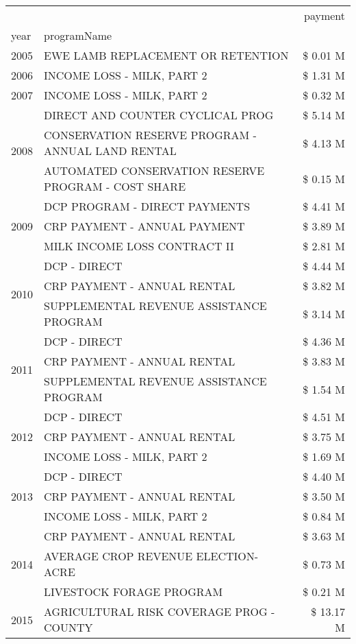 \begin{tabular}{llr}
\toprule
 &  & payment \\
year & programName &  \\
\midrule
2005 & EWE LAMB REPLACEMENT OR RETENTION & \$ 0.01 M \\
\cline{1-3}
2006 & INCOME LOSS - MILK, PART 2 & \$ 1.31 M \\
\cline{1-3}
2007 & INCOME LOSS - MILK, PART 2 & \$ 0.32 M \\
\cline{1-3}
\multirow[t]{3}{*}{2008} & DIRECT AND COUNTER CYCLICAL PROG & \$ 5.14 M \\
 & CONSERVATION RESERVE PROGRAM - ANNUAL LAND RENTAL & \$ 4.13 M \\
 & AUTOMATED CONSERVATION RESERVE PROGRAM - COST SHARE & \$ 0.15 M \\
\cline{1-3}
\multirow[t]{3}{*}{2009} & DCP PROGRAM - DIRECT PAYMENTS & \$ 4.41 M \\
 & CRP PAYMENT - ANNUAL PAYMENT & \$ 3.89 M \\
 & MILK INCOME LOSS CONTRACT II & \$ 2.81 M \\
\cline{1-3}
\multirow[t]{3}{*}{2010} & DCP - DIRECT & \$ 4.44 M \\
 & CRP PAYMENT - ANNUAL RENTAL & \$ 3.82 M \\
 & SUPPLEMENTAL REVENUE ASSISTANCE PROGRAM & \$ 3.14 M \\
\cline{1-3}
\multirow[t]{3}{*}{2011} & DCP - DIRECT & \$ 4.36 M \\
 & CRP PAYMENT - ANNUAL RENTAL & \$ 3.83 M \\
 & SUPPLEMENTAL REVENUE ASSISTANCE PROGRAM & \$ 1.54 M \\
\cline{1-3}
\multirow[t]{3}{*}{2012} & DCP - DIRECT & \$ 4.51 M \\
 & CRP PAYMENT - ANNUAL RENTAL & \$ 3.75 M \\
 & INCOME LOSS - MILK, PART 2 & \$ 1.69 M \\
\cline{1-3}
\multirow[t]{3}{*}{2013} & DCP - DIRECT & \$ 4.40 M \\
 & CRP PAYMENT - ANNUAL RENTAL & \$ 3.50 M \\
 & INCOME LOSS - MILK, PART 2 & \$ 0.84 M \\
\cline{1-3}
\multirow[t]{3}{*}{2014} & CRP PAYMENT - ANNUAL RENTAL & \$ 3.63 M \\
 & AVERAGE CROP REVENUE ELECTION-ACRE & \$ 0.73 M \\
 & LIVESTOCK FORAGE PROGRAM & \$ 0.21 M \\
\cline{1-3}
\multirow[t]{3}{*}{2015} & AGRICULTURAL RISK COVERAGE PROG - COUNTY & \$ 13.17 M \\

\end{tabular}
